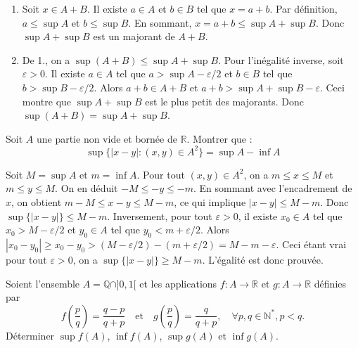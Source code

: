 \documentclass[solutions]{exercices}
\begin{document}
\begin{solution}
\begin{enumerate}
	\item Soit $x \in A+B$. Il existe $a \in A$ et $b \in B$ tel que $x=a+b$. Par définition, $a \le \sup A$ et $b \le \sup B$. En sommant, $x = a+b \le \sup A + \sup B$. Donc $\sup A + \sup B$ est un majorant de $A+B$.
	\item De 1., on a $\sup(A+B) \le \sup A + \sup B$. Pour l'inégalité inverse, soit $\varepsilon > 0$. Il existe $a \in A$ tel que $a > \sup A - \varepsilon/2$ et $b \in B$ tel que $b > \sup B - \varepsilon/2$. Alors $a+b \in A+B$ et $a+b > \sup A + \sup B - \varepsilon$. Ceci montre que $\sup A + \sup B$ est le plus petit des majorants. Donc $\sup(A+B) = \sup A + \sup B$.
\end{enumerate}
\end{solution}

\begin{exercice}
Soit $A$ une partie non vide et bornée de $\mathbb{R}$. Montrer que :
\[ \sup\{|x - y|: (x, y) \in A^2\} = \sup A - \inf A \]
\end{exercice}

\begin{solution}
Soit $M = \sup A$ et $m = \inf A$. Pour tout $(x,y) \in A^2$, on a $m \le x \le M$ et $m \le y \le M$.
On en déduit $-M \le -y \le -m$. En sommant avec l'encadrement de $x$, on obtient $m-M \le x-y \le M-m$, ce qui implique $|x-y| \le M-m$. Donc $\sup\{|x-y|\} \le M-m$.
Inversement, pour tout $\varepsilon > 0$, il existe $x_0 \in A$ tel que $x_0 > M-\varepsilon/2$ et $y_0 \in A$ tel que $y_0 < m+\varepsilon/2$. Alors $|x_0 - y_0| \ge x_0-y_0 > (M-\varepsilon/2)-(m+\varepsilon/2) = M-m-\varepsilon$. Ceci étant vrai pour tout $\varepsilon>0$, on a $\sup\{|x-y|\} \ge M-m$. L'égalité est donc prouvée.
\end{solution}

\begin{exercice}
Soient l'ensemble $A = \mathbb{Q} \cap ]0, 1[$ et les applications $f: A \to \mathbb{R}$ et $g: A \to \mathbb{R}$ définies par
\[ f(\frac{p}{q}) = \frac{q-p}{q+p} \quad \text{et} \quad g(\frac{p}{q}) = \frac{q}{q+p}, \quad \forall p,q \in \mathbb{N}^*, p < q. \]
Déterminer $\sup f(A)$, $\inf f(A)$, $\sup g(A)$ et $\inf g(A)$.
\end{exercice}
\end{document}
